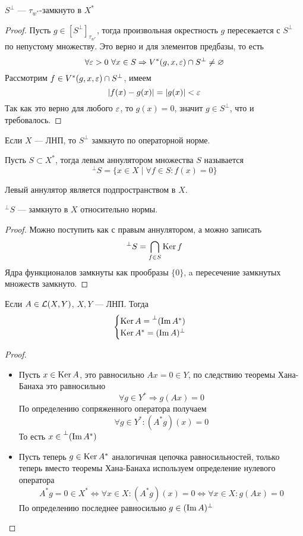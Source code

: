 \begin{claim}\label{claim:twcl}
	$S^\perp$ --- $\tau_{w^*}$-замкнуто в $X^*$
\end{claim}
\begin{proof}
	Пусть $g \in [S^\perp]_{\tau_{w^*}}$, тогда произвольная окрестность $g$ пересекается с $S^\perp$ по непустому множеству. Это верно и для элементов предбазы, то есть
	$$
	\forall \varepsilon > 0 \ \forall x \in S \Rightarrow V^*(g,x,\varepsilon) \cap S^\perp \neq \varnothing
	$$
	Рассмотрим $f \in V^*(g,x,\varepsilon) \cap S^\perp$, имеем
	$$
	|f(x) - g(x)| = |g(x)| < \varepsilon 
	$$
	Так как это верно для любого $\varepsilon$, то $g(x) = 0$, значит $g \in S^\perp$, что и требовалось.
\end{proof}
\begin{next}
	Если $X$ --- ЛНП, то $S^\perp$ замкнуто по операторной норме.  
\end{next}
\begin{definition}
	Пусть $S \subset X^*$, тогда левым аннулятором множества $S$ называется
	$$
	^\perp S = \{x \in X \mid \forall f \in S\colon f(x) = 0\}
	$$
\end{definition}
Левый аннулятор является подпространством в $X$. 
\begin{claim}
	$^\perp S $ --- замкнуто в $X$ относительно нормы. 
\end{claim}
\begin{proof}
	Можно поступить как с правым аннулятором, а можно записать 
	$$
	^\perp S = \bigcap_{f \in S}\operatorname{Ker} f 
	$$
	Ядра функционалов замкнуты как прообразы $\{0\}$, a пересечение замкнутых множеств замкнуто.
\end{proof}
\begin{theorem}[Фредгольм]\label{th:fr}
	Если $A \in \mathcal{L}(X,Y)$, $X,Y$ --- ЛНП. Тогда
	$$
	\begin{cases}
		\operatorname{Ker} A = \prescript{\perp}{}{(\operatorname{Im}A^*)} \\   
		\operatorname{Ker} A^* = (\operatorname{Im} A)^\perp
	\end{cases}
	$$
\end{theorem}
\begin{proof}
	\begin{itemize}
		\item Пусть $ x \in \operatorname{Ker} A$, это равносильно $Ax = 0 \in Y$, по следствию теоремы Хана-Банаха это равносильно 
		$$
		\forall g \in Y^* \Rightarrow g(Ax) = 0
		$$
		По определению сопряженного оператора получаем 
		$$\forall g \in Y^* \colon (A^*g)(x) = 0$$
		То есть $x \in \prescript{\perp}{}{(\operatorname{Im}A^*)} $
		\item Пусть теперь $g \in \operatorname{Ker} A^*$ аналогичная цепочка равносильностей, только теперь вместо теоремы Хана-Банаха используем определение нулевого оператора
		$$
		A^*g = 0 \in X^* \Leftrightarrow \forall x \in X\colon (A^*g)(x) = 0 \Leftrightarrow \forall x \in X\colon g(Ax) = 0
		$$
		По определению последнее равносильно $g \in (\operatorname{Im} A)^\perp$
	\end{itemize}
\end{proof}
